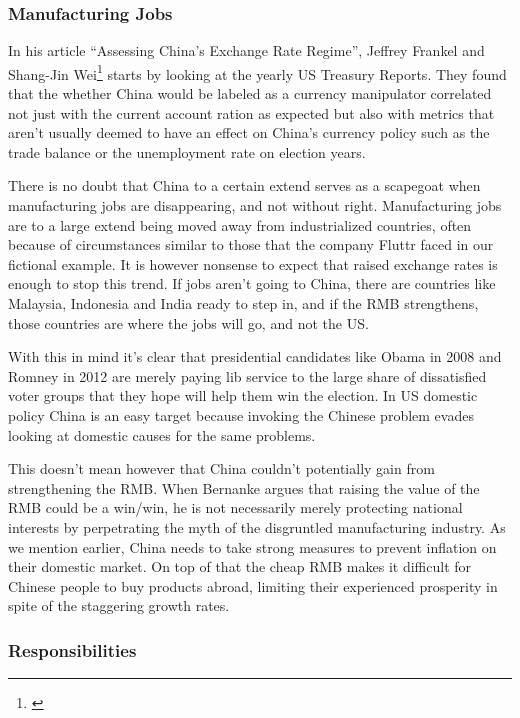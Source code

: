 \subsubsection{Manufacturing Jobs}

In his article ``Assessing China's Exchange Rate Regime'', Jeffrey 
Frankel and Shang-Jin Wei\footnote{\cite{Frankel07}} starts by looking 
at the yearly US Treasury Reports. They found that the whether China 
would be labeled as a currency manipulator correlated not just with the 
current account ration as expected but also with metrics that aren't 
usually deemed to have an effect on China's currency policy such as the 
trade balance or the unemployment rate on election years. 

There is no doubt that China to a certain extend serves as a scapegoat 
when manufacturing jobs are disappearing, and not without right.  
Manufacturing jobs are to a large extend being moved away from 
industrialized countries, often because of circumstances similar to 
those that the company Fluttr faced in our fictional example. It is 
however nonsense to expect that raised exchange rates is enough to stop 
this trend. If jobs aren't going to China, there are countries like 
Malaysia, Indonesia and India ready to step in, and if the RMB 
strengthens, those countries are where the jobs will go, and not the US.

With this in mind it's clear that presidential candidates like Obama in 
2008 and Romney in 2012 are merely paying lib service to the large share 
of dissatisfied voter groups that they hope will help them win the 
election. In US domestic policy China is an easy target because invoking 
the Chinese problem evades looking at domestic causes for the same 
problems.

This doesn't mean however that China couldn't potentially gain from 
strengthening the RMB. When Bernanke argues that raising the value of 
the RMB could be a win/win, he is not necessarily merely protecting 
national interests by perpetrating the myth of the disgruntled 
manufacturing industry. As we mention earlier, China needs to take 
strong measures to prevent inflation on their domestic market. On top of 
that the cheap RMB makes it difficult for Chinese people to buy products 
abroad, limiting their experienced prosperity in spite of the staggering 
growth rates.

\subsubsection{Responsibilities}

